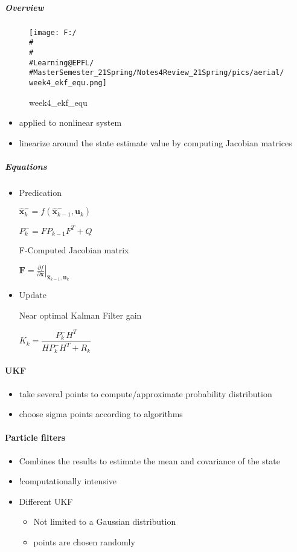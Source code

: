 \documentclass[]{article}
\let\oldparagraph\paragraph
\renewcommand{\paragraph}[1]{\oldparagraph{#1}\mbox{}}
\let\oldsubparagraph\subparagraph
\renewcommand{\subparagraph}[1]{\oldsubparagraph{#1}\mbox{}}
\begin{document}
\subparagraph{Overview}\label{header-n974}

\begin{figure}
\centering
\texttt{[image: F:/\\\#\\\#\\\#Learning@EPFL/\\\#MasterSemester\_21Spring/Notes4Review\_21Spring/pics/aerial/week4\_ekf\_equ.png]}
\caption{week4\_ekf\_equ}
\end{figure}

\begin{itemize}
\item
  applied to nonlinear system
\item
  linearize around the state estimate value by computing Jacobian
  matrices
\end{itemize}

\subparagraph{Equations}\label{header-n981}

\begin{itemize}
\item
  Predication

  \(\hat{\boldsymbol{x}}_{k}^{-}=f\left(\hat{\boldsymbol{x}}_{k-1}^{-}, \boldsymbol{u}_{k}\right)\)

  \(P_{k}^{-}=F P_{k-1} F^{T}+Q\)

  F-Computed Jacobian matrix

  \(\boldsymbol{F}=\left.\frac{\partial f}{\partial \boldsymbol{x}}\right|_{\hat{\boldsymbol{x}}_{k-1}, \boldsymbol{u}_{k}}\)
\item
  Update

  Near optimal Kalman Filter gain

  \(K_{k}=\dfrac{P_{k}^{-} H^{T}}{H P_{k}^{-} H^{T}+R_k}\)
\end{itemize}

\paragraph{UKF}\label{header-n993}

\begin{itemize}
\item
  take several points to compute/approximate probability distribution
\item
  choose sigma points according to algorithms
\end{itemize}

\paragraph{Particle filters}\label{header-n999}

\begin{itemize}
\item
  Combines the results to estimate the mean and covariance of the state
\item
  !computationally intensive
\item
  Different UKF

  \begin{itemize}
  \item
    Not limited to a Gaussian distribution
  \item
    points are chosen randomly
  \end{itemize}
\end{itemize}
\end{document}
